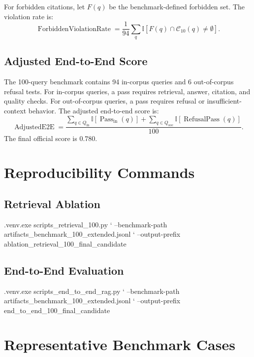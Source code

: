 For forbidden citations, let $F(q)$ be the benchmark-defined forbidden set. The violation rate is:
\[
\operatorname{ForbiddenViolationRate} =
\frac{1}{94}
\sum_{q}
\mathbb{I}\left[F(q) \cap \mathcal{C}_{10}(q) \neq \emptyset\right].
\]

\subsection{Adjusted End-to-End Score}
The 100-query benchmark contains 94 in-corpus queries and 6 out-of-corpus refusal tests. For in-corpus queries, a pass requires retrieval, answer, citation, and quality checks. For out-of-corpus queries, a pass requires refusal or insufficient-context behavior. The adjusted end-to-end score is:
\[
\operatorname{AdjustedE2E} =
\frac{
\sum_{q \in Q_{\mathrm{in}}}\mathbb{I}[\operatorname{Pass}_{\mathrm{in}}(q)]
+
\sum_{q \in Q_{\mathrm{ooc}}}\mathbb{I}[\operatorname{RefusalPass}(q)]
}{100}.
\]
The final official score is $0.780$.

\section{Reproducibility Commands}

\subsection{Retrieval Ablation}
\begin{ThesisCode}
.venv\Scripts\python.exe scripts\ablation_retrieval_100.py `
  --benchmark-path artifacts\evaluation\golden_benchmark_100_extended.jsonl `
  --output-prefix ablation_retrieval_100_final_candidate
\end{ThesisCode}

\subsection{End-to-End Evaluation}
\begin{ThesisCode}
.venv\Scripts\python.exe scripts\evaluate_end_to_end_rag.py `
  --benchmark-path artifacts\evaluation\golden_benchmark_100_extended.jsonl `
  --output-prefix end_to_end_100_final_candidate
\end{ThesisCode}

\section{Representative Benchmark Cases}

